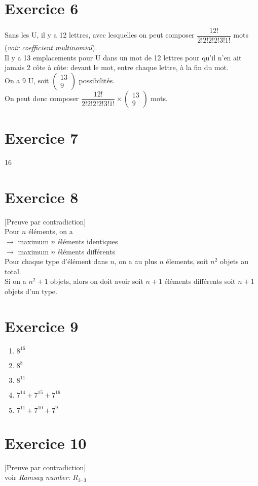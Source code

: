 \documentclass[fontsize=10pt]{article}
\begin{document}
\section*{Exercice 6}
Sans les U, il y a 12 lettres, avec lesquelles on peut composer $\dfrac{12!}{2!2!2!2!3!1!}$ mots (\textit{voir coefficient multinomial}).\\
Il y a 13 emplacements pour U dans un mot de 12 lettres pour qu'il n'en ait jamais 2 côte à côte: devant le mot, entre chaque lettre, à la fin du mot.\\
On a 9 U, soit $\begin{pmatrix}
13\\
9
\end{pmatrix}$ possibilités.\\
On peut donc composer $\dfrac{12!}{2!2!2!2!3!1!} \times \begin{pmatrix}
13\\
9
\end{pmatrix}$ mots.


\section*{Exercice 7}
16
\section*{Exercice 8}
[Preuve par contradiction]\\
Pour $n$ éléments, on a \\
$\rightarrow$ maximum $n$ éléments identiques\\
$\rightarrow$ maximum $n$ éléments différents\\
Pour chaque type d'élément dans $n$, on a au plus $n$ élements, soit $n^2$ objets au total.\\
Si on a $n^2+1$ objets, alors on doit avoir soit $n+1$ éléments différents soit $n+1$ objets d'un type.
\section*{Exercice 9}
\begin{enumerate}
\item $8^{16}$
\item $8^8$
\item $8^{11}$
\item $7^{14}+7^{15}+7^{16}$
\item $7^{11}+7^{10}+7^{9}$
\end{enumerate}
\section*{Exercice 10}
[Preuve par contradiction]\\
voir \textit{Ramsay number}: $R_{3\cdot3}$ 
\end{document}
